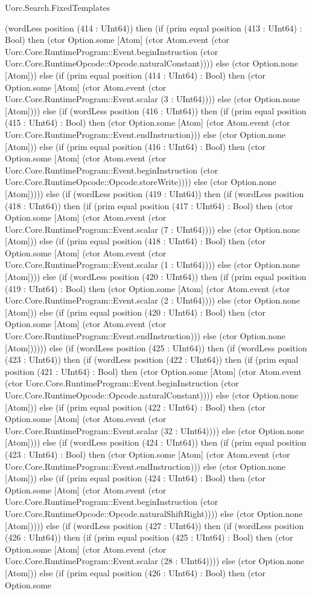 \begin{lexlean}{Uorc.Search.FixedTemplates}
\begin{semanticmodule}
{(wordLess position (414 : UInt64)) then (if (prim equal position (413 : UInt64) : Bool) then (ctor Option.some [Atom] (ctor Atom.event (ctor Uorc.Core.RuntimeProgram::Event.beginInstruction (ctor Uorc.Core.RuntimeOpcode::Opcode.naturalConstant)))) else (ctor Option.none [Atom])) else (if (prim equal position (414 : UInt64) : Bool) then (ctor Option.some [Atom] (ctor Atom.event (ctor Uorc.Core.RuntimeProgram::Event.scalar (3 : UInt64)))) else (ctor Option.none [Atom]))) else (if (wordLess position (416 : UInt64)) then (if (prim equal position (415 : UInt64) : Bool) then (ctor Option.some [Atom] (ctor Atom.event (ctor Uorc.Core.RuntimeProgram::Event.endInstruction))) else (ctor Option.none [Atom])) else (if (prim equal position (416 : UInt64) : Bool) then (ctor Option.some [Atom] (ctor Atom.event (ctor Uorc.Core.RuntimeProgram::Event.beginInstruction (ctor Uorc.Core.RuntimeOpcode::Opcode.storeWrite)))) else (ctor Option.none [Atom])))) else (if (wordLess position (419 : UInt64)) then (if (wordLess position (418 : UInt64)) then (if (prim equal position (417 : UInt64) : Bool) then (ctor Option.some [Atom] (ctor Atom.event (ctor Uorc.Core.RuntimeProgram::Event.scalar (7 : UInt64)))) else (ctor Option.none [Atom])) else (if (prim equal position (418 : UInt64) : Bool) then (ctor Option.some [Atom] (ctor Atom.event (ctor Uorc.Core.RuntimeProgram::Event.scalar (1 : UInt64)))) else (ctor Option.none [Atom]))) else (if (wordLess position (420 : UInt64)) then (if (prim equal position (419 : UInt64) : Bool) then (ctor Option.some [Atom] (ctor Atom.event (ctor Uorc.Core.RuntimeProgram::Event.scalar (2 : UInt64)))) else (ctor Option.none [Atom])) else (if (prim equal position (420 : UInt64) : Bool) then (ctor Option.some [Atom] (ctor Atom.event (ctor Uorc.Core.RuntimeProgram::Event.endInstruction))) else (ctor Option.none [Atom]))))) else (if (wordLess position (425 : UInt64)) then (if (wordLess position (423 : UInt64)) then (if (wordLess position (422 : UInt64)) then (if (prim equal position (421 : UInt64) : Bool) then (ctor Option.some [Atom] (ctor Atom.event (ctor Uorc.Core.RuntimeProgram::Event.beginInstruction (ctor Uorc.Core.RuntimeOpcode::Opcode.naturalConstant)))) else (ctor Option.none [Atom])) else (if (prim equal position (422 : UInt64) : Bool) then (ctor Option.some [Atom] (ctor Atom.event (ctor Uorc.Core.RuntimeProgram::Event.scalar (32 : UInt64)))) else (ctor Option.none [Atom]))) else (if (wordLess position (424 : UInt64)) then (if (prim equal position (423 : UInt64) : Bool) then (ctor Option.some [Atom] (ctor Atom.event (ctor Uorc.Core.RuntimeProgram::Event.endInstruction))) else (ctor Option.none [Atom])) else (if (prim equal position (424 : UInt64) : Bool) then (ctor Option.some [Atom] (ctor Atom.event (ctor Uorc.Core.RuntimeProgram::Event.beginInstruction (ctor Uorc.Core.RuntimeOpcode::Opcode.naturalShiftRight)))) else (ctor Option.none [Atom])))) else (if (wordLess position (427 : UInt64)) then (if (wordLess position (426 : UInt64)) then (if (prim equal position (425 : UInt64) : Bool) then (ctor Option.some [Atom] (ctor Atom.event (ctor Uorc.Core.RuntimeProgram::Event.scalar (28 : UInt64)))) else (ctor Option.none [Atom])) else (if (prim equal position (426 : UInt64) : Bool) then (ctor Option.some }
\end{semanticmodule}
\end{lexlean}
